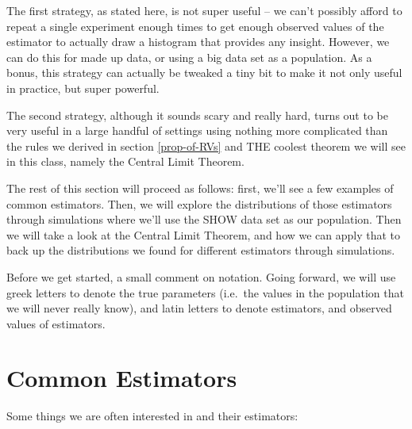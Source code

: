 \documentclass[]{book}
\theoremstyle{definition}
\theoremstyle{definition}
\theoremstyle{definition}
\theoremstyle{remark}
\begin{document}
The first strategy, as stated here, is not super useful -- we can't possibly afford to repeat a single experiment enough times to get enough observed values of the estimator to actually draw a histogram that provides any insight. However, we can do this for made up data, or using a big data set as a population. As a bonus, this strategy can actually be tweaked a tiny bit to make it not only useful in practice, but super powerful.

The second strategy, although it sounds scary and really hard, turns out to be very useful in a large handful of settings using nothing more complicated than the rules we derived in section \ref{prop-of-RVs} and THE coolest theorem we will see in this class, namely the Central Limit Theorem.

The rest of this section will proceed as follows: first, we'll see a few examples of common estimators. Then, we will explore the distributions of those estimators through simulations where we'll use the SHOW data set as our population. Then we will take a look at the Central Limit Theorem, and how we can apply that to back up the distributions we found for different estimators through simulations.

Before we get started, a small comment on notation. Going forward, we will use greek letters to denote the true parameters (i.e.~the values in the population that we will never really know), and latin letters to denote estimators, and observed values of estimators.

\hypertarget{common-estimators}{%
\section{Common Estimators}\label{common-estimators}}

Some things we are often interested in and their estimators:
\end{document}
